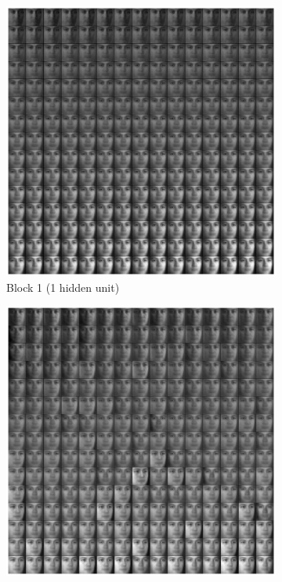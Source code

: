 \begin{figure}
\centering
    \begin{subfigure}[b]{0.5\textwidth}
    \includegraphics[width=\textwidth]{images/faceBlock1.eps}
    \vspace{-2\baselineskip}
    \caption{Block 1 (1 hidden unit)}
    \end{subfigure}
	\begin{subfigure}[b]{0.5\textwidth}
    \includegraphics[width=\textwidth]{images/faceBlock2.eps}

\end{subfigure}
\end{figure}
